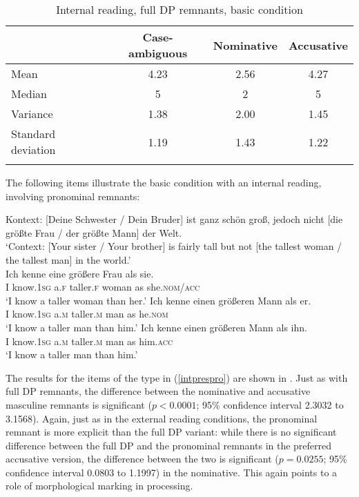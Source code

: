 \begin{table}
\begin{tabular}{l *3{S[table-format=1.2]}}
\lsptoprule
{} & {Case-ambiguous} & {Nominative} & {Accusative}\\\midrule
Mean & 4.23 & 2.56 & 4.27\\
Median & 5 & 2 & 5\\
Variance & 1.38 & 2.00 & 1.45\\
Standard deviation & 1.19 & 1.43 & 1.22\\
\lspbottomrule
\end{tabular}
\caption{Internal reading, full DP remnants, basic condition}
\label{tableintpresfull}
\end{table} 


The following items illustrate the basic condition with an internal reading, involving pronominal remnants:

\ea Kontext: [Deine Schwester / Dein Bruder] ist ganz schön groß, jedoch nicht [die größte Frau / der größte Mann] der Welt. \label{intprespro}\\
`Context: [Your sister / Your brother] is fairly tall but not [the tallest woman / the tallest man] in the world.'\\
\ea \gll Ich kenne eine größere Frau als sie. \label{intpresproambig}\\
I know.\textsc{1sg} a.\textsc{f} taller.\textsc{f} woman as she.\textsc{nom/acc}\\
\glt `I know a taller woman than her.'
\ex \gll Ich kenne einen größeren Mann als er. \label{intprespronom}\\
I know.\textsc{1sg} a.\textsc{m} taller.\textsc{m} man as he.\textsc{nom}\\
\glt `I know a taller man than him.'
\ex \gll Ich kenne einen größeren Mann als ihn. \label{intpresproacc}\\
I know.\textsc{1sg} a.\textsc{m} taller.\textsc{m} man as him.\textsc{acc}\\
\glt `I know a taller man than him.'
\z
\z

The results for the items of the type in (\ref{intprespro}) are shown in .
Just as with full DP remnants, the difference between the nominative and accusative masculine remnants is significant ($p<0.0001$; 95\% confidence interval 2.3032 to 3.1568). Again, just as in the external reading conditions, the pronominal remnant is more explicit than the full DP variant: while there is no significant difference between the full DP and the pronominal remnants in the preferred accusative version, the difference between the two is significant ($p=0.0255$; 95\% confidence interval 0.0803 to 1.1997) in the nominative. This again points to a role of morphological marking in processing.

